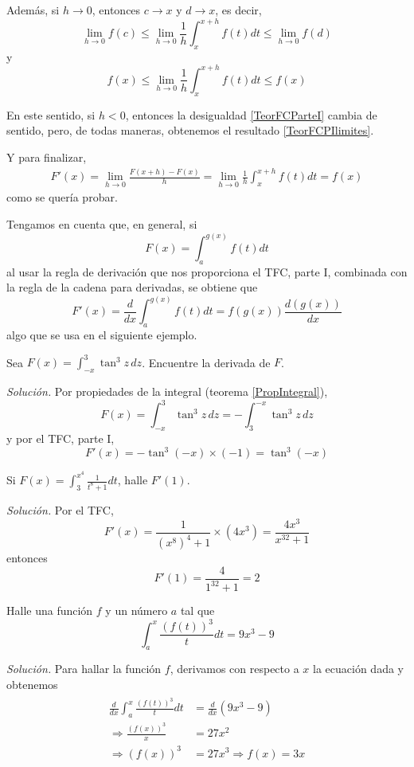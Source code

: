 \enlargethispage*{\baselineskip}

Además, si $h\rightarrow 0$, entonces $c\to x$ y $d\to x$, es decir,
\[
\lim_{h\rightarrow 0}f(c)\leq \lim_{h\rightarrow 0}\frac{1}{h}
\int_{x}^{x+h}f(t)dt\leq \lim_{h\rightarrow 0}f(d)
\]
y
\begin{equation}\label{TeorFCPIlimites}
f(x) \leq \lim_{h\rightarrow 0}\frac{1}{h}\int_{x}^{x+h}f(t)dt\leq f(x)
\end{equation}

En este sentido, si $h<0$, entonces la desigualdad \eqref{TeorFCParteI} cambia de sentido, pero, de todas maneras, obtenemos el resultado \eqref{TeorFCPIlimites}.

Y para finalizar,
\begin{align*}
F'(x)=\lim_{h\rightarrow 0}\frac{ F(x+h)-F(x)}{h}=\lim_{h\rightarrow 0}\frac{1}{h}\int_{x}^{x+h}f(t)dt=f(x)
\end{align*}
como se quería probar.

Tengamos en cuenta que, en general, si
\[
F(x)=\int_{a}^{g(x)}f(t)dt
\]
al usar la regla de derivación que nos proporciona el TFC, parte I, combinada con la regla de la cadena
para derivadas, se obtiene que
\[
F'(x)=\frac{d}{dx}\int_{a}^{g(x)}f(t)dt=f(g(x))\frac{d(g(x))}{dx}
\]
algo que se usa en el siguiente ejemplo.

\begin{ejemplo}
Sea $F(x) =\int_{-x}^{3}\tan ^{3}z\,dz$. Encuentre la derivada de $F$.
\end{ejemplo}

\emph{Solución.} Por propiedades de la integral (teorema \ref{PropIntegral}),
\[
F(x) =\int_{-x}^{3}\tan ^{3}z\,dz=-\int_{3}^{-x}\tan
^{3}z\,dz
\]
y por el TFC, parte I,
\[
F'(x) =-\tan ^{3}(-x) \times \left( -1\right)
=\tan ^{3}(-x)
\]

\begin{ejemplo} Si $F(x) =\int_{3}^{x^{4}}\frac{1}{t^{8}+1}dt$, halle $F'\left(1\right)$.
\end{ejemplo}

\emph{Solución.} Por el TFC,
\[
F'(x)=\frac{1}{(x^8)^4+1}\times(4x^3)=\frac{ 4x^{3}}{x^{32}+1}
\]
entonces
\[F'\left( 1\right) =\frac{4}{1^{32}+1}= 2\]

\begin{ejemplo}
Halle una función $f$ y un número $a$ tal que
\[
\int_{a}^{x}\frac{\left( f(t) \right) ^{3}}{t}dt=9x^{3}-9
\]
\end{ejemplo}

\emph{Solución.} Para hallar la función $f$, derivamos con respecto a $x$ la ecuación dada y obtenemos
\begin{gather*}
\begin{aligned}
\frac{d}{dx}\int_{a}^{x}\frac{\left( f(t) \right) ^{3}}{t}dt&=\frac{d}{dx}\left( 9x^{3}-9\right)\\
\Rightarrow \frac{\left( f(x)\right) ^{3}}{x}&=27x^{2}\\
\Rightarrow \left( f(x) \right)^{3}&=27x^{3}
\Rightarrow f(x) = 3x
\end{aligned}
\end{gather*}

